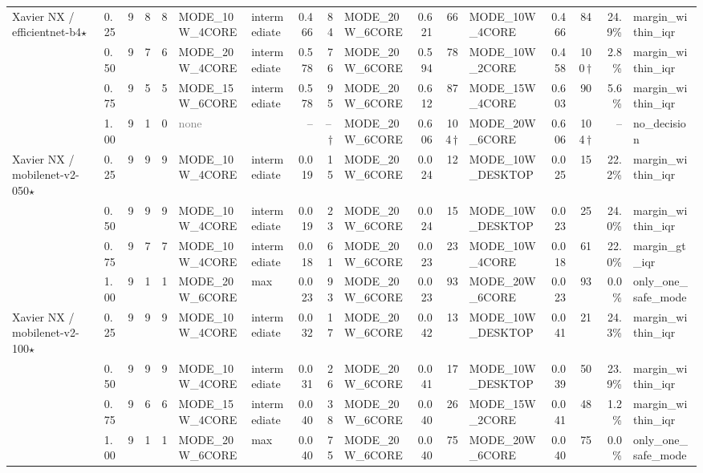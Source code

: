 \documentclass[10pt]{article}
\begin{document}
\begin{center}
\begin{longtable}{@{}l l r r r l l r r l r r l r r r l@{}}
\addlinespace[2pt]
Xavier NX / efficientnet-b4$\star$ & 0.25 & 9 & 8 & 8 & MODE\_10W\_4CORE & intermediate & 0.466 & 84 & MODE\_20W\_6CORE & 0.621 & 66 & MODE\_10W\_4CORE & 0.466 & 84 & 24.9\% & margin\_within\_iqr \\
 & 0.50 & 9 & 7 & 6 & MODE\_20W\_4CORE & intermediate & 0.578 & 76 & MODE\_20W\_6CORE & 0.594 & 78 & MODE\_10W\_2CORE & 0.458 & 100\,$\dagger$ & 2.8\% & margin\_within\_iqr \\
 & 0.75 & 9 & 5 & 5 & MODE\_15W\_6CORE & intermediate & 0.578 & 95 & MODE\_20W\_6CORE & 0.612 & 87 & MODE\_15W\_4CORE & 0.603 & 90 & 5.6\% & margin\_within\_iqr \\
 & 1.00 & 9 & 1 & 0 & \textcolor{gray}{none} &  & -- & --\,$\dagger$ & MODE\_20W\_6CORE & 0.606 & 104\,$\dagger$ & MODE\_20W\_6CORE & 0.606 & 104\,$\dagger$ & -- & no\_decision \\
\addlinespace[2pt]
Xavier NX / mobilenet-v2-050$\star$ & 0.25 & 9 & 9 & 9 & MODE\_10W\_4CORE & intermediate & 0.019 & 15 & MODE\_20W\_6CORE & 0.024 & 12 & MODE\_10W\_DESKTOP & 0.025 & 15 & 22.2\% & margin\_within\_iqr \\
 & 0.50 & 9 & 9 & 9 & MODE\_10W\_4CORE & intermediate & 0.019 & 23 & MODE\_20W\_6CORE & 0.024 & 15 & MODE\_10W\_DESKTOP & 0.023 & 25 & 24.0\% & margin\_within\_iqr \\
 & 0.75 & 9 & 7 & 7 & MODE\_10W\_4CORE & intermediate & 0.018 & 61 & MODE\_20W\_6CORE & 0.023 & 23 & MODE\_10W\_4CORE & 0.018 & 61 & 22.0\% & margin\_gt\_iqr \\
 & 1.00 & 9 & 1 & 1 & MODE\_20W\_6CORE & max & 0.023 & 93 & MODE\_20W\_6CORE & 0.023 & 93 & MODE\_20W\_6CORE & 0.023 & 93 & 0.0\% & only\_one\_safe\_mode \\
\addlinespace[2pt]
Xavier NX / mobilenet-v2-100$\star$ & 0.25 & 9 & 9 & 9 & MODE\_10W\_4CORE & intermediate & 0.032 & 17 & MODE\_20W\_6CORE & 0.042 & 13 & MODE\_10W\_DESKTOP & 0.041 & 21 & 24.3\% & margin\_within\_iqr \\
 & 0.50 & 9 & 9 & 9 & MODE\_10W\_4CORE & intermediate & 0.031 & 26 & MODE\_20W\_6CORE & 0.041 & 17 & MODE\_10W\_DESKTOP & 0.039 & 50 & 23.9\% & margin\_within\_iqr \\
 & 0.75 & 9 & 6 & 6 & MODE\_15W\_4CORE & intermediate & 0.040 & 38 & MODE\_20W\_6CORE & 0.040 & 26 & MODE\_15W\_2CORE & 0.041 & 48 & 1.2\% & margin\_within\_iqr \\
 & 1.00 & 9 & 1 & 1 & MODE\_20W\_6CORE & max & 0.040 & 75 & MODE\_20W\_6CORE & 0.040 & 75 & MODE\_20W\_6CORE & 0.040 & 75 & 0.0\% & only\_one\_safe\_mode \\

\end{longtable}
\end{center}
\end{document}
